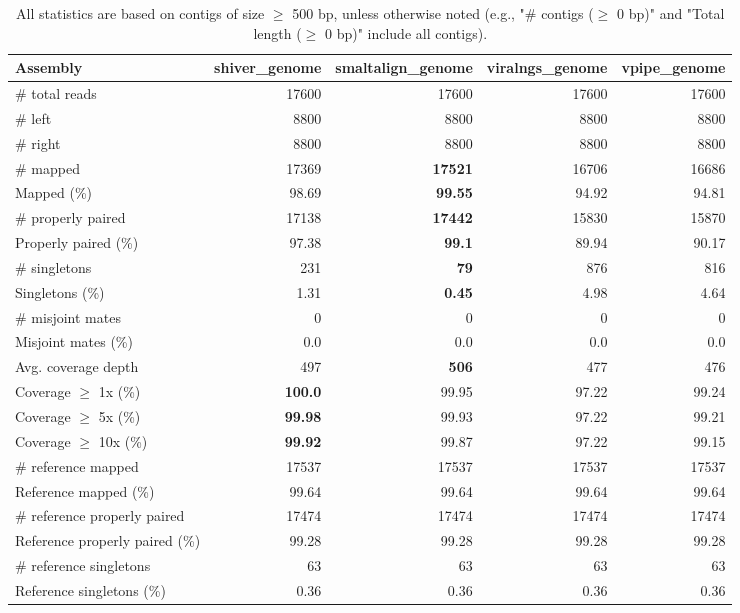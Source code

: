 \documentclass[12pt,a4paper]{article}
\begin{document}
\begin{table}[ht]
\begin{center}
\caption{All statistics are based on contigs of size $\geq$ 500 bp, unless otherwise noted (e.g., "\# contigs ($\geq$ 0 bp)" and "Total length ($\geq$ 0 bp)" include all contigs).}
\begin{tabular}{|l*{4}{|r}|}
\hline
Assembly & shiver\_genome & smaltalign\_genome & viralngs\_genome & vpipe\_genome \\ \hline
\# total reads & 17600 & 17600 & 17600 & 17600 \\ \hline
\# left & 8800 & 8800 & 8800 & 8800 \\ \hline
\# right & 8800 & 8800 & 8800 & 8800 \\ \hline
\# mapped & 17369 & {\bf 17521} & 16706 & 16686 \\ \hline
Mapped (\%) & 98.69 & {\bf 99.55} & 94.92 & 94.81 \\ \hline
\# properly paired & 17138 & {\bf 17442} & 15830 & 15870 \\ \hline
Properly paired (\%) & 97.38 & {\bf 99.1} & 89.94 & 90.17 \\ \hline
\# singletons & 231 & {\bf 79} & 876 & 816 \\ \hline
Singletons (\%) & 1.31 & {\bf 0.45} & 4.98 & 4.64 \\ \hline
\# misjoint mates & 0 & 0 & 0 & 0 \\ \hline
Misjoint mates (\%) & 0.0 & 0.0 & 0.0 & 0.0 \\ \hline
Avg. coverage depth & 497 & {\bf 506} & 477 & 476 \\ \hline
Coverage $\geq$ 1x (\%) & {\bf 100.0} & 99.95 & 97.22 & 99.24 \\ \hline
Coverage $\geq$ 5x (\%) & {\bf 99.98} & 99.93 & 97.22 & 99.21 \\ \hline
Coverage $\geq$ 10x (\%) & {\bf 99.92} & 99.87 & 97.22 & 99.15 \\ \hline
\# reference mapped & 17537 & 17537 & 17537 & 17537 \\ \hline
Reference mapped (\%) & 99.64 & 99.64 & 99.64 & 99.64 \\ \hline
\# reference properly paired & 17474 & 17474 & 17474 & 17474 \\ \hline
Reference properly paired (\%) & 99.28 & 99.28 & 99.28 & 99.28 \\ \hline
\# reference singletons & 63 & 63 & 63 & 63 \\ \hline
Reference singletons (\%) & 0.36 & 0.36 & 0.36 & 0.36 \\ \hline

\end{tabular}
\end{center}
\end{table}
\end{document}
